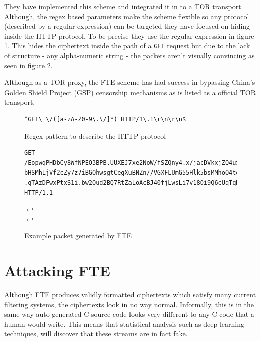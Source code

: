 \documentclass[ %
                    author={Samuel Russell},
                supervisor={Prof. Bogdan Warinschi},
                    degree={MEng},
                     title={Innocuous Ciphertexts},
                  subtitle={The DE-CENSOR Scheme},
                      type={research},
                      year={2018} ]{dissertation}
\begin{document}
They have implemented this scheme and integrated it in to a TOR transport. Although, the regex based parameters make the scheme flexible so any protocol (described by a regular expression) can be targeted they have focused on hiding inside the HTTP protocol. To be precise they use the regular expression in figure \ref{fig:http-regex}. This hides the ciphertext inside the path of a \texttt{GET} request but due to the lack of structure - any alpha-numeric string - the packets aren't visually convincing as seen in figure \ref{fig:http-ex}.

Although as a TOR proxy, the FTE scheme has had success in bypassing China's Golden Shield Project (GSP) censorship mechanisms as is listed as a official TOR transport.

\begin{figure}[h]
\begin{verbatim}
^GET\ \/([a-zA-Z0-9\.\/]*) HTTP/1\.1\r\n\r\n$
\end{verbatim}
\caption{Regex pattern to describe the HTTP protocol}
\label{fig:http-regex}
\end{figure}


\begin{figure}[h]
\begin{verbatim}
GET /EopwqPHDbCy8WfNPEO3BPB.UUXEJ7xe2NoW/fSZQny4.x/jacDVkxjZQ4uSqgZu7.N2AGbaYeFqr/DEh
bHSMhLjVf2cZy7z7iBGOhwsgtCegXuBNZn//VGXFLUmG55Hlk5bsMMhoO4tqF.mYApGxAd2c0G/goOnZLivQB
.qTAzDFwxPtxS1i.bw2Oud2BQ7RtZaLoAcBJ40fjLwsLi7v18Oi9Q6cUqTqHKTMsVWijB9/kh HTTP/1.1
\end{verbatim}
$\hookleftarrow$\\
$\hookleftarrow$
\caption{Example packet generated by FTE}
\label{fig:http-ex}
\end{figure}




\section{Attacking FTE}\label{attacking_fte}

Although FTE produces validly formatted ciphertexts which satisfy many current filtering systems, the ciphertexts look in no way normal.
Informally, this is in the same way auto generated C source code looks very different to any C code that a human would write.
This means that statistical analysis such as deep learning techniques, will discover that these streams are in fact fake.
\end{document}
